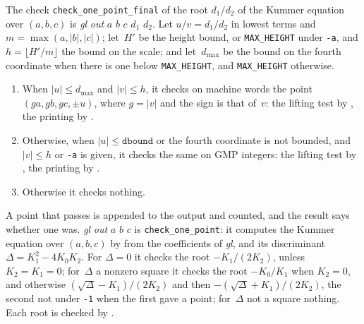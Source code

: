 \begin{definition}\label{def:checkOnePoint}
  \leanok
  The check \texttt{check\_one\_point\_final} of the root $d_1/d_2$ of the Kummer equation over
  $(a, b, c)$ is  \textit{gl} \textit{out} $a$ $b$ $c$ $d_1$
  $d_2$. Let $u/v = d_1/d_2$ in lowest terms and $m = \max(a, |b|, |c|)$; let~$H'$ be the height
  bound, or \texttt{MAX\_HEIGHT} under \texttt{-a}, and $h = \lfloor H'/m \rfloor$ the bound on the
  scale; and let~$d_{\max}$ be the bound on the fourth coordinate when there is one below
  \texttt{MAX\_HEIGHT}, and \texttt{MAX\_HEIGHT} otherwise.
  \begin{enumerate}
    \item When $|u| \le d_{\max}$ and $|v| \le h$, it checks on machine words the point $(ga,
      gb, gc, \pm u)$, where $g = |v|$ and the sign is that of~$v$: the lifting test by
      , the printing by .
    \item Otherwise, when $|u| \le \mathtt{dbound}$ or the fourth coordinate is not bounded, and
      $|v| \le h$ or \texttt{-a} is given, it checks the same on GMP integers: the lifting test
      by , the printing by .
    \item Otherwise it checks nothing.
  \end{enumerate}
  A point that passes is appended to the output and counted, and the result says whether one was.
   \textit{gl} \textit{out} $a$ $b$ $c$ is \texttt{check\_one\_point}:
  it computes the Kummer equation over $(a, b, c)$ by  from the
  coefficients of \textit{gl}, and its discriminant $\Delta = K_1^2 - 4K_0K_2$. For $\Delta = 0$ it
  checks the root $-K_1/(2K_2)$, unless $K_2 = K_1 = 0$; for~$\Delta$ a nonzero square it checks
  the root $-K_0/K_1$ when $K_2 = 0$, and otherwise $(\sqrt\Delta - K_1)/(2K_2)$ and then
  $-(\sqrt\Delta + K_1)/(2K_2)$, the second not under \texttt{-1} when the first gave a point;
  for~$\Delta$ not a square nothing. Each root is checked by .
\end{definition}



